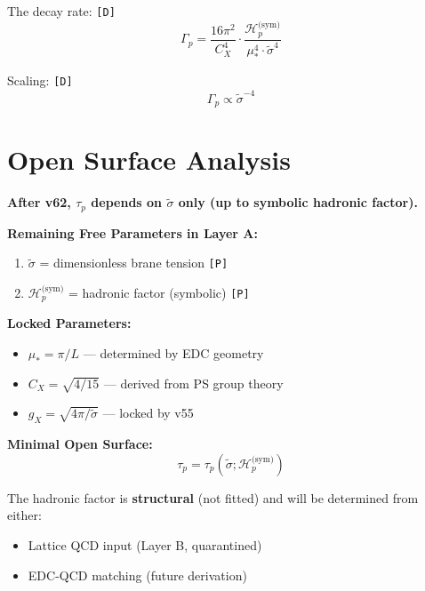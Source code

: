\documentclass[11pt,a4paper]{article}
\newcommand{\tagD}{\textcolor{green!50!black}{\texttt{[D]}}}
\newcommand{\tagP}{\textcolor{orange!80!black}{\texttt{[P]}}}
\theoremstyle{definition}
\begin{document}
The decay rate: \tagD{}
\begin{equation}
\label{eq:rate-canonical}
\Gamma_p = \frac{16\pi^2}{C_X^4} \cdot \frac{\mathcal{H}_p^{\text{(sym)}}}{\mu_*^4 \cdot \tilde{\sigma}^4}
\end{equation}

Scaling: \tagD{}
\begin{equation}
\label{eq:rate-canonical-scaling}
\Gamma_p \propto \tilde{\sigma}^{-4}
\end{equation}

\section{Open Surface Analysis}
\label{sec:open-surface}

\begin{opensurfacebox}
\textbf{After v62, $\tau_p$ depends on $\tilde{\sigma}$ only (up to symbolic hadronic factor).}

\textbf{Remaining Free Parameters in Layer A:}
\begin{enumerate}
  \item $\tilde{\sigma}$ = dimensionless brane tension \tagP{}
  \item $\mathcal{H}_p^{\text{(sym)}}$ = hadronic factor (symbolic) \tagP{}
\end{enumerate}

\textbf{Locked Parameters:}
\begin{itemize}
  \item $\mu_* = \pi/L$ --- determined by EDC geometry
  \item $C_X = \sqrt{4/15}$ --- derived from PS group theory
  \item $g_X = \sqrt{4\pi/\tilde{\sigma}}$ --- locked by v55
\end{itemize}

\textbf{Minimal Open Surface:}
\begin{equation}
\label{eq:open-surface-minimal}
\boxed{\tau_p = \tau_p(\tilde{\sigma}; \mathcal{H}_p^{\text{(sym)}})}
\end{equation}

The hadronic factor is \textbf{structural} (not fitted) and will be determined
from either:
\begin{itemize}
  \item Lattice QCD input (Layer B, quarantined)
  \item EDC-QCD matching (future derivation)
\end{itemize}
\end{opensurfacebox}
\end{document}
